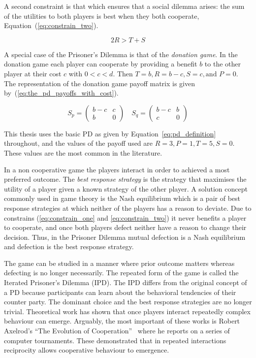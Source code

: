A second constraint is that which ensures that a social dilemma arises: the sum
of the utilities to both players is best when they both cooperate,
Equation~(\ref{eq:constrain_two}).

\begin{equation}\label{eq:constrain_two}
    2R > T + S
\end{equation}

A special case of the Prisoner's Dilemma is that of the \textit{donation game}.
In the donation game each player can cooperate by providing a benefit \(b\) to
the other player at their cost \(c\) with \(0 < c < d\). Then \(T=b, R=b-c,S=c,
\text{and } P=0\). The representation of the donation game payoff matrix is
given by~(\ref{eq:the_pd_payoffs_with_cost}).

\begin{equation}\label{eq:the_pd_payoffs_with_cost}
    S_p =
    \begin{pmatrix}
        b - c & c\\
        b & 0
    \end{pmatrix}
    \quad
    S_q =
    \begin{pmatrix}
        b - c & b  \\
        c & 0
    \end{pmatrix}
\end{equation}

This thesis uses the basic PD as given by Equation~\ref{eq:pd_definition}
throughout, and the values of the payoff used are \(R = 3,P = 1,T = 5,S = 0\).
These values are the most common in the literature.

In a non cooperative game the players interact in order to achieved a most
preferred outcome. The \textit{best response strategy} is the strategy
that maximises the utility of a player given a known strategy of the other
player. A solution concept commonly used in game theory is the Nash equilibrium
which is a pair of best response strategies at which neither of the players has
a reason to deviate. Due to constrains (\ref{eq:constrain_one} and
\ref{eq:constrain_two}) it never benefits a player to cooperate, and once both
players defect neither have a reason to change their decision. Thus, in the
Prisoner Dilemma mutual defection is a Nash equilibrium and defection is the
best response strategy.

The game can be studied in a manner where prior outcome matters whereas
defecting is no longer necessarily. The repeated form of the game is called the
Iterated Prisoner's Dilemma (IPD). The IPD differs from the original concept of
a PD because participants can learn about the behavioral tendencies of their
counter party. The dominant choice and the best response strategies are no
longer trivial. Theoretical work has shown that once players interact repeatedly
complex behaviour can emerge. Arguably, the most important of these works is
Robert Axelrod's ``The Evolution of Cooperation''~\cite{Axelrod1984} where he
reports on a series of computer tournaments. These demonstrated that in repeated
interactions reciprocity allows cooperative behaviour to emergence.

